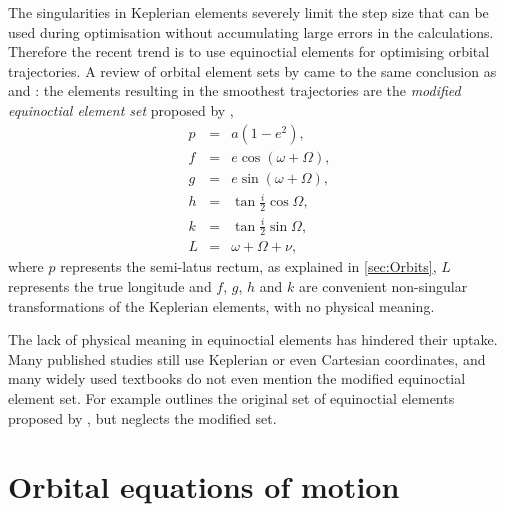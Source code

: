The singularities in Keplerian elements severely limit the step size that can be used during optimisation without accumulating large errors in the calculations. Therefore the recent trend is to use equinoctial elements for optimising orbital trajectories. A review of orbital element sets by \textcite{Hintz2008} came to the same conclusion as \citeauthor{Letterio_thesis} and \citeauthor{Keppeler_thesis}: the elements resulting in the smoothest trajectories are the \emph{modified equinoctial element set} proposed by \textcite{Walker1985}, 
\begin{subequations}\label{eq:states}
\begin{eqnarray}
p & = & a(1-e^{2}) \label{eq:p},\\
f & = & e\cos(\omega+\Omega) \label{eq:f},\\
g & = & e\sin(\omega+\Omega) \label{eq:g},\\
h & = & \tan\frac{i}{2}\cos\Omega \label{eq:h},\\
k & = & \tan\frac{i}{2}\sin\Omega \label{eq:k},\\
L & = & \omega+\Omega+\nu \label{eq:L},
\end{eqnarray}
\end{subequations}
where $p$ represents the semi-latus rectum, as explained in \autoref{sec:Orbits}, $L$ represents the true longitude and $f$, $g$, $h$ and $k$ are convenient non-singular transformations of the Keplerian elements, with no physical meaning.

The lack of physical meaning in equinoctial elements has hindered their uptake. Many published studies still use Keplerian or even Cartesian coordinates, and many widely used textbooks do not even mention the modified equinoctial element set. For example \textcite[][p. 194]{Chobotov2002} outlines the original set of equinoctial elements proposed by \textcite{Broucke1972}, but neglects the modified set.





\section{Orbital equations of motion} \label{sec:Orbital-equations-of-motion}

